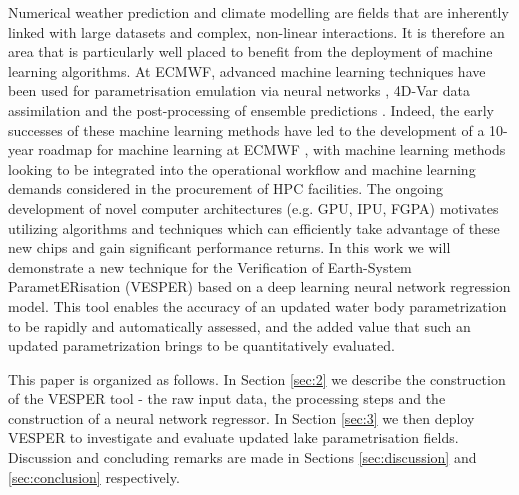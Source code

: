\documentclass[hess, twostagejnl]{copernicus}
\begin{document}
\noindent Numerical weather prediction and climate modelling are fields that are inherently linked with large datasets and complex, non-linear interactions. It is therefore an area that is particularly well placed to benefit from the deployment of machine learning algorithms. At ECMWF, advanced machine learning techniques have been used for parametrisation emulation via neural networks \citep{Chantry2021}, 4D-Var data assimilation \citep{Hatfield2021} and the post-processing of ensemble predictions \citep{Hewson2021}. Indeed, the early successes of these machine learning methods have led to the development of a 10-year roadmap for machine learning at ECMWF \citep{p19877}, with machine learning methods looking to be integrated into the operational workflow and machine learning demands considered in the procurement of HPC facilities. The ongoing development of novel computer architectures (e.g. GPU, IPU, FGPA) motivates utilizing algorithms and techniques which can efficiently take advantage of these new chips and gain significant performance returns. In this work we will demonstrate a new technique for the Verification of Earth-System ParametERisation (VESPER) based on a deep learning neural network regression model. This tool enables the accuracy of an updated water body parametrization to be rapidly and automatically assessed, and the added value that such an updated parametrization brings to be quantitatively evaluated. \newline 


\noindent This paper is organized as follows. In Section \ref{sec:2} we describe the construction of the VESPER tool - the raw input data, the processing steps and the construction of a neural network regressor. In Section \ref{sec:3} we then deploy VESPER to investigate and evaluate updated lake parametrisation fields. Discussion and concluding remarks are made in Sections \ref{sec:discussion} and \ref{sec:conclusion} respectively. 
\end{document}
